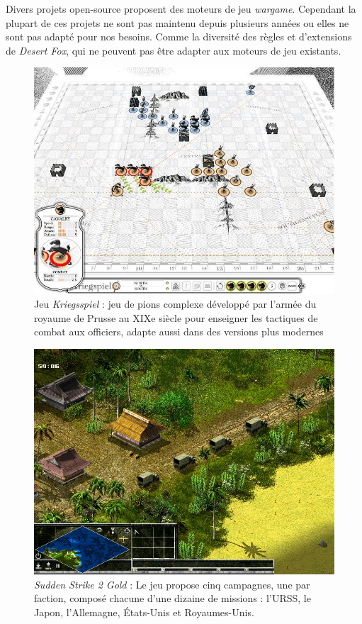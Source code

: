\documentclass{article}[a4paper, 12pt]
\begin{document}
Divers projets open-source proposent des moteurs de jeu \emph{wargame}. Cependant la plupart de ces projets ne sont pas maintenu depuis plusieurs années ou elles ne sont pas adapté pour nos besoins. Comme la diversité des règles et d'extensions de \emph{Desert Fox}, qui ne peuvent pas être adapter aux moteurs de jeu existants.

\begin{figure}[H]
\centering
\includegraphics[scale=0.5]{kriegspiel.jpeg}
\caption{Jeu \textit{Kriegsspiel} : jeu de pions complexe développé par l'armée du royaume de Prusse au XIXe siècle pour enseigner les tactiques de combat aux officiers, adapte aussi dans des versions plus modernes \cite{livermore1879american}}
\end{figure}

\begin{figure}[H]
\centering
\includegraphics[scale=0.3]{ss_e593c9966bc58b7326287db455776b2291718f76.1920x1080.jpg}
\caption{\textit{Sudden Strike 2 Gold} : Le jeu propose cinq campagnes, une par faction, composé chacune d’une dizaine de missions : l'URSS, le Japon, l'Allemagne, États-Unis et Royaumes-Unis.}
\end{figure}
\end{document}
